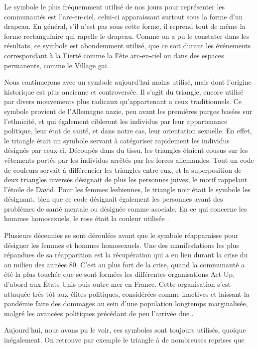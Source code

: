 Le symbole le plus fréquemment utilisé de nos jours pour représenter les communautés \lgbt{} est l'arc-en-ciel, celui-ci apparaissant surtout sous la forme d'un drapeau.
En général, s'il n'est pas sous cette forme, il reprend tout de même la forme rectangulaire qui rapelle le drapeau.
Comme on a pu le constater dans les résultats, ce symbole est abondemment utilisé, que ce soit durant les événements correspondant à la Fierté comme la Fête arc-en-ciel ou dans des espaces permanents, comme le Village gai.

Nous continuerons avec un symbole aujourd'hui moins utilisé, mais dont l'origine historique est plus ancienne et controversée.
Il s'agit du triangle, encore utilisé par divers mouvements plus radicaux qu'appartenant a ceux traditionnels.
Ce symbole provient de l'Allemagne nazie, peu avant les premières purges basées sur l'ethnicité, et qui également cibleront les individus par leur appartenance politique, leur état de santé, et dans notre cas, leur orientation sexuelle.
En effet, le triangle était un symbole servant à catégoriser rapidement les individus désignés par ceux-ci.
Découpés dans du tissu, les triangles étaient cousus sur les vêtements portés par les individus arrêtés par les forces allemandes.
Tout un code de couleurs servait à différencier les triangles entre eux, et la superposition de deux triangles inversés désignait de plus les personnes juives, le motif rappelant l'étoile de David.
Pour les femmes lesbiennes, le triangle noir était le symbole les désignant, bien que ce code désignait également les personnes ayant des problèmes de santé mentale ou désignée comme asociale.
En ce qui concerne les hommes homosexuels, le rose était la couleur utilisée \missref{}.

Plusieurs décennies se sont déroulées avant que le symbole réapparaisse pour désigner les femmes et hommes homosexuels.
Une des manifestations les plus répandues de sa réapparition est la récupération qui a eu lieu durant la crise du \vih{} au milieu des années 80.
C'est au plus fort de la crise, quand la communauté \lgbt{} a été la plus touchée que se sont formées les différentes organisations Act-Up, d'abord aux États-Unis puis outre-mer en France.
Cette organisation s'est attaquée très tôt aux élites politiques, considérées comme inactives et laissant la pandémie faire des dommages au sein d'une population longtemps marginalisée, malgré les avancées politiques précédant de peu l'arrivée due \vih{}.

Aujourd'hui, nous avons pu le voir, ces symboles sont toujours utilisés, quoique inégalement.
On retrouve par exemple le triangle à de nombreuses reprises que

